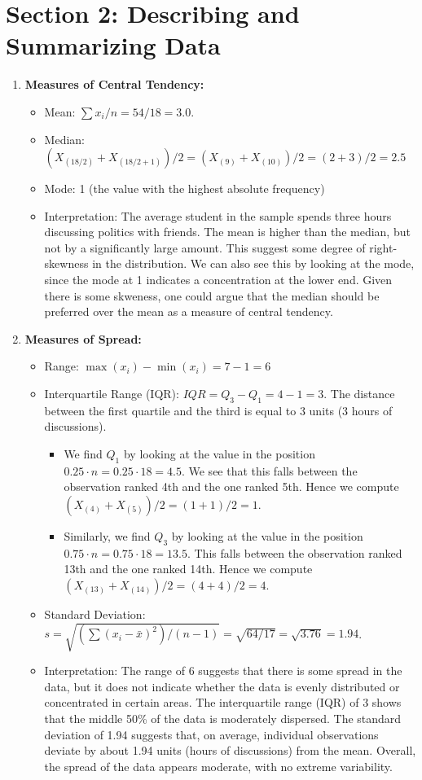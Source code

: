 \documentclass{article}
\begin{document}
\section*{Section 2: Describing and Summarizing Data}

\begin{enumerate}
\item \textbf{Measures of Central Tendency:}\begin{itemize}
\item Mean: $\sum x_i / n = 54/ 18 = 3.0$. 
\item Median: $(X_{(18/2)}+X_{(18/2+1)})/2=(X_{(9)}+X_{(10)})/2=(2+3)/2=2.5$
\item Mode: 1 (the value with the highest absolute frequency)
\item Interpretation: The average student in the sample spends three hours discussing politics with friends. The mean is higher than the median, but not by a significantly large amount. This suggest some degree of right-skewness in the distribution. We can also see this by looking at the mode, since the mode at 1 indicates a concentration at the lower end. Given there is some skweness, one could argue that the median should be preferred over the mean as a measure of central tendency. 
\end{itemize}
\item \textbf{Measures of Spread:}  
\begin{itemize}
    \item Range: $\max(x_i)-\min(x_i)=7-1=6$
    \item Interquartile Range (IQR): $IQR=Q_3-Q_1=4-1=3$. The distance between the first quartile and the third is equal to 3 units (3 hours of discussions).
        \begin{itemize}
            \item We find $Q_1$ by looking at the value in the position $0.25\cdot n=0.25\cdot 18=4.5$. We see that this falls between the observation ranked 4th and the one ranked 5th. Hence we compute $(X_{(4)}+X_{(5)})/2=(1+1)/2=1$.
            \item Similarly, we find $Q_3$ by looking at the value in the position $0.75\cdot n=0.75\cdot 18=13.5$. This falls between the observation ranked 13th and the one ranked 14th. Hence we compute $(X_{(13)}+X_{(14)})/2=(4+4)/2=4$.
        \end{itemize}
    \item Standard Deviation: $s=\sqrt{(\sum (x_i-\bar{x})^2 )/ (n-1) }= \sqrt{64/ 17} = \sqrt{3.76} = 1.94 $.
    \item Interpretation: The range of 6 suggests that there is some spread in the data, but it does not indicate whether the data is evenly distributed or concentrated in certain areas. The interquartile range (IQR) of 3 shows that the middle 50\% of the data is moderately dispersed. The standard deviation of 1.94 suggests that, on average, individual observations deviate by about 1.94 units (hours of discussions) from the mean. Overall, the spread of the data appears moderate, with no extreme variability.


\end{itemize}
\end{enumerate}
\end{document}
